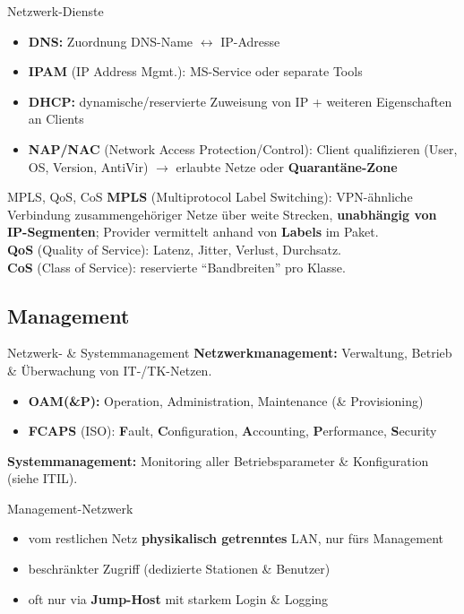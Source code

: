 \documentclass[a4paper, fontsize=7pt]{scrartcl}
\begin{document}
\begin{mainbox}{Netzwerk-Dienste}
\begin{itemize}
    \item \textbf{DNS:} Zuordnung DNS-Name $\leftrightarrow$ IP-Adresse
    \item \textbf{IPAM} (IP Address Mgmt.): MS-Service oder separate Tools
    \item \textbf{DHCP:} dynamische/reservierte Zuweisung von IP + weiteren
          Eigenschaften an Clients
    \item \textbf{NAP/NAC} (Network Access Protection/Control):
          Client qualifizieren (User, OS, Version, AntiVir) $\to$ erlaubte
          Netze oder \textbf{Quarantäne-Zone}
\end{itemize}
\end{mainbox}

\begin{mainbox}{MPLS, QoS, CoS}
\textbf{MPLS} (Multiprotocol Label Switching): VPN-ähnliche Verbindung
zusammengehöriger Netze über weite Strecken, \textbf{unabhängig von
IP-Segmenten}; Provider vermittelt anhand von \textbf{Labels} im Paket.\\
\textbf{QoS} (Quality of Service): Latenz, Jitter, Verlust, Durchsatz.\\
\textbf{CoS} (Class of Service): reservierte ``Bandbreiten'' pro Klasse.
\end{mainbox}

\subsection{Management}

\begin{mainbox}{Netzwerk- \& Systemmanagement}
\textbf{Netzwerkmanagement:} Verwaltung, Betrieb \& Überwachung von
IT-/TK-Netzen.
\begin{itemize}
    \item \textbf{OAM(\&P):} Operation, Administration, Maintenance
          (\& Provisioning)
    \item \textbf{FCAPS} (ISO): \textbf{F}ault, \textbf{C}onfiguration,
          \textbf{A}ccounting, \textbf{P}erformance, \textbf{S}ecurity
\end{itemize}
\textbf{Systemmanagement:} Monitoring aller Betriebsparameter \&
Konfiguration (siehe ITIL).
\end{mainbox}

\begin{mainbox}{Management-Netzwerk}
\begin{itemize}
    \item vom restlichen Netz \textbf{physikalisch getrenntes} LAN, nur
          fürs Management
    \item beschränkter Zugriff (dedizierte Stationen \& Benutzer)
    \item oft nur via \textbf{Jump-Host} mit starkem Login \& Logging
\end{itemize}
\end{mainbox}
\end{document}
